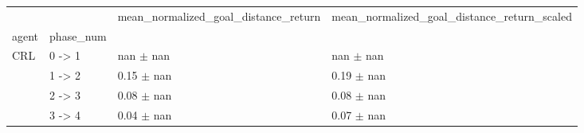 \begin{tabular}{llll}
\toprule
 &  & mean_normalized_goal_distance_return & mean_normalized_goal_distance_return_scaled \\
agent & phase_num &  &  \\
\midrule
\multirow[t]{4}{*}{CRL} & 0 -> 1 & nan $\pm$ nan & nan $\pm$ nan \\
 & 1 -> 2 & 0.15 $\pm$ nan & 0.19 $\pm$ nan \\
 & 2 -> 3 & 0.08 $\pm$ nan & 0.08 $\pm$ nan \\
 & 3 -> 4 & 0.04 $\pm$ nan & 0.07 $\pm$ nan \\
\cline{1-4}
\bottomrule
\end{tabular}
